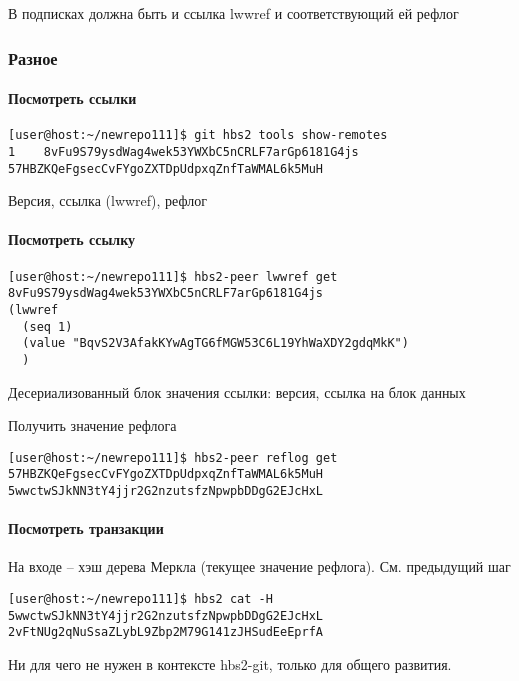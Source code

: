\documentclass[11pt,a4paper]{article}
\begin{document}
В подписках должна быть и ссылка lwwref и соответствующий ей рефлог

\subsubsection{Разное}

\paragraph{Посмотреть ссылки}

\begin{verbatim}
[user@host:~/newrepo111]$ git hbs2 tools show-remotes
1    8vFu9S79ysdWag4wek53YWXbC5nCRLF7arGp6181G4js 57HBZKQeFgsecCvFYgoZXTDpUdpxqZnfTaWMAL6k5MuH
\end{verbatim}

Версия, ссылка (lwwref), рефлог

\paragraph{Посмотреть ссылку}

\begin{verbatim}
[user@host:~/newrepo111]$ hbs2-peer lwwref get 8vFu9S79ysdWag4wek53YWXbC5nCRLF7arGp6181G4js
(lwwref
  (seq 1)
  (value "BqvS2V3AfakKYwAgTG6fMGW53C6L19YhWaXDY2gdqMkK")
  )
\end{verbatim}

Десериализованный блок значения ссылки: версия, ссылка на блок данных

Получить значение рефлога
\begin{verbatim}
[user@host:~/newrepo111]$ hbs2-peer reflog get 57HBZKQeFgsecCvFYgoZXTDpUdpxqZnfTaWMAL6k5MuH
5wwctwSJkNN3tY4jjr2G2nzutsfzNpwpbDDgG2EJcHxL
\end{verbatim}

\paragraph{Посмотреть транзакции}

На входе -- хэш дерева Меркла (текущее значение рефлога). См. предыдущий шаг

\begin{verbatim}
[user@host:~/newrepo111]$ hbs2 cat -H 5wwctwSJkNN3tY4jjr2G2nzutsfzNpwpbDDgG2EJcHxL
2vFtNUg2qNuSsaZLybL9Zbp2M79G141zJHSudEeEprfA
\end{verbatim}

Ни для чего не нужен в контексте hbs2-git, только для общего развития.
\end{document}
